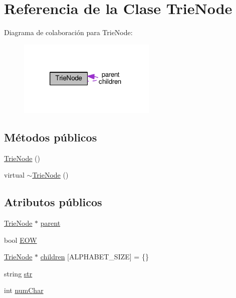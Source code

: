 \hypertarget{class_trie_node}{\section{Referencia de la Clase Trie\-Node}
\label{class_trie_node}
}


Diagrama de colaboración para Trie\-Node\-:\nopagebreak
\begin{figure}[H]
\begin{center}
\leavevmode
\includegraphics[width=187pt]{class_trie_node__coll__graph}
\end{center}
\end{figure}
\subsection*{Métodos públicos}
\begin{DoxyCompactItemize}
\item 
\hyperlink{class_trie_node_a3c44872f26b52fa29a38c91e69b22103}{Trie\-Node} ()
\item 
virtual \hyperlink{class_trie_node_a2c338a9960c601bbe654668cbe4f18a5}{$\sim$\-Trie\-Node} ()
\end{DoxyCompactItemize}
\subsection*{Atributos públicos}
\begin{DoxyCompactItemize}
\item 
\hyperlink{class_trie_node}{Trie\-Node} $\ast$ \hyperlink{class_trie_node_a523e346979214a75557e582fef02b3fd}{parent}
\item 
bool \hyperlink{class_trie_node_aeb4c2795d110df8c1fee5b494051e56d}{E\-O\-W}
\item 
\hyperlink{class_trie_node}{Trie\-Node} $\ast$ \hyperlink{class_trie_node_a3e37dd20032584eedaa6f45fda2b9698}{children} \mbox{[}A\-L\-P\-H\-A\-B\-E\-T\-\_\-\-S\-I\-Z\-E\mbox{]} = \{\}
\item 
string \hyperlink{class_trie_node_aa5fbf2d2487f8d1f3eecee4e8b999a16}{str}
\item 
int \hyperlink{class_trie_node_ae4cc4f53f8e5e06de5f460f6e8bbe0bb}{num\-Char}
\end{DoxyCompactItemize}


